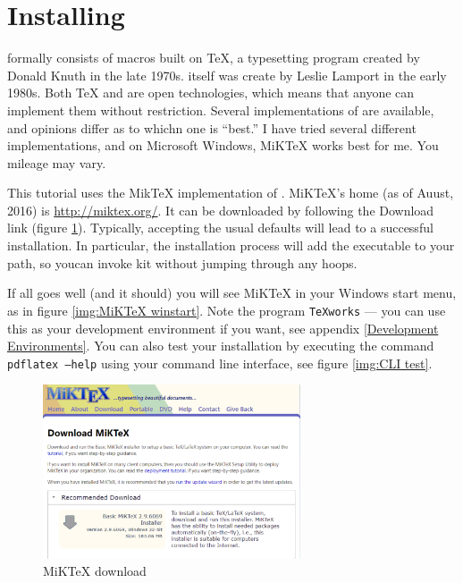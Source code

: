 

    \section{Installing \LaTeXe}
    \label{Installing}

    \Lx{} formally consists of macros built on \TeX{}, a typesetting program created by Donald Knuth in the late 1970s. \Lx{} itself was create by Leslie Lamport in the early 1980s. Both \TeX{} and \Lx{} are open technologies, which means that anyone can implement them without restriction. Several implementations of \Lx{} are available, and opinions differ as to whichn one is ``best.'' I have tried several different implementations, and on Microsoft Windows, MiKTeX works best for me. You mileage may vary.
    
    This tutorial uses the MikTeX implementation of \Lx{}. MiKTeX's home (as of Auust, 2016) is \url{http://miktex.org/}. It can be downloaded by following the Download link (figure \ref{img:MiKTeX download}).  Typically, accepting the usual defaults will lead to a successful installation. In particular, the installation process will add the executable to your path, so youcan invoke kit without jumping through any hoops.

    If all goes well (and it should) you will see MiKTeX in your Windows start menu, as in figure \ref{img:MiKTeX winstart}. Note the program \texttt{TeXworks} --- you can use this as your \Lx{} development environment if you want, see appendix \ref{Development Environments}. You can also test your installation by executing the command \texttt{pdflatex --help} using your command line interface, see figure \ref{img:CLI test}.

    \begin{figure}[!hb]
        \includegraphics[width=3in]{../images/miktex-download.pdf}
        \caption{MiKTeX download}
        \label{img:MiKTeX download}
    \end{figure}

